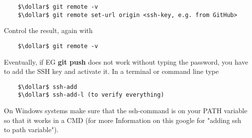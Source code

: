 \begin{lstlisting}
	$\dollar$ git remote -v
	$\dollar$ git remote set-url origin <ssh-key, e.g. from GitHub>
\end{lstlisting}
Control the result, again with
\begin{lstlisting}
	$\dollar$ git remote -v
\end{lstlisting}
Eventually, if \ac{EG} \textbf{git push} does not work without typing the password, you have to add the SSH key and activate it. In a terminal or command line type
\begin{lstlisting}
	$\dollar$ ssh-add
	$\dollar$ ssh-add-l (to verify everything)
\end{lstlisting}
On Windows  systems make sure that the ssh-command is on your PATH variable so that it works in a CMD (for more Information on this google for "adding ssh to path variable").









